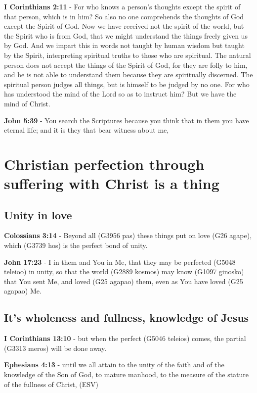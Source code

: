 \documentclass[11pt]{article}
\begin{document}
\textbf{I Corinthians 2:11} - For who knows a person's thoughts except the spirit of that person, which is in him? So also no one comprehends the thoughts of God except the Spirit of God. Now we have received not the spirit of the world, but the Spirit who is from God, that we might understand the things freely given us by God. And we impart this in words not taught by human wisdom but taught by the Spirit, interpreting spiritual truths to those who are spiritual. The natural person does not accept the things of the Spirit of God, for they are folly to him, and he is not able to understand them because they are spiritually discerned. The spiritual person judges all things, but is himself to be judged by no one. For who has understood the mind of the Lord so as to instruct him? But we have the mind of Christ.

\textbf{John 5:39} - You search the Scriptures because you think that in them you have eternal life; and it is they that bear witness about me,

\section{Christian perfection through suffering with Christ is a thing}
\label{sec:org06f499d}
\subsection{Unity in love}
\label{sec:orgbb1b0ba}
\textbf{Colossians 3:14} - Beyond all (G3956 pas) these things put on love (G26 agape), which (G3739 hos) is the perfect bond of unity.

\textbf{John 17:23} - I in them and You in Me, that they may be perfected (G5048 teleioo) in unity, so that the world (G2889 kosmos) may know (G1097 ginosko) that You sent Me, and loved (G25 agapao) them, even as You have loved (G25 agapao) Me.

\subsection{It's wholeness and fullness, knowledge of Jesus}
\label{sec:org8097f5a}
\textbf{I Corinthians 13:10} - but when the perfect (G5046 teleios) comes, the partial (G3313 meros) will be done away.

\textbf{Ephesians 4:13} - until we all attain to the unity of the faith and of the knowledge of the Son of God, to mature manhood, to the measure of the stature of the fullness of Christ, (ESV)
\end{document}
